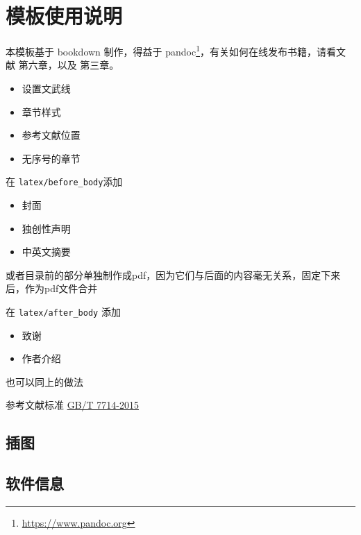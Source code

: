 \documentclass[]{ctexbook}
\date{}
\providecommand{\tightlist}{%
  \setlength{\itemsep}{0pt}\setlength{\parskip}{0pt}}
\theoremstyle{definition}
\theoremstyle{definition}
\theoremstyle{definition}
\theoremstyle{remark}
\begin{document}

% 


{
\setcounter{tocdepth}{2}
\tableofcontents
}
\chapter{模板使用说明}

本模板基于 bookdown 制作，得益于 pandoc\footnote{\url{https://www.pandoc.org}}，有关如何在线发布书籍，请看文献
\citep{bookdown2016CRC} 第六章，以及 \citep{blogdown2017CRC} 第三章。

\begin{itemize}
\tightlist
\item
  设置文武线
\item
  章节样式
\item
  参考文献位置
\item
  无序号的章节
\end{itemize}

在 \texttt{latex/before\_body}添加

\begin{itemize}
\tightlist
\item
  封面
\item
  独创性声明
\item
  中英文摘要
\end{itemize}

或者目录前的部分单独制作成pdf，因为它们与后面的内容毫无关系，固定下来后，作为pdf文件合并

在 \texttt{latex/after\_body} 添加

\begin{itemize}
\tightlist
\item
  致谢
\item
  作者介绍
\end{itemize}

也可以同上的做法

参考文献标准
\href{https://github.com/Haixing-Hu/GBT7714-2005-BibTeX-Style/files/153951/GBT.7714-2015.pdf}{GB/T
7714-2015}

\section{插图}

\section{软件信息}
\end{document}
